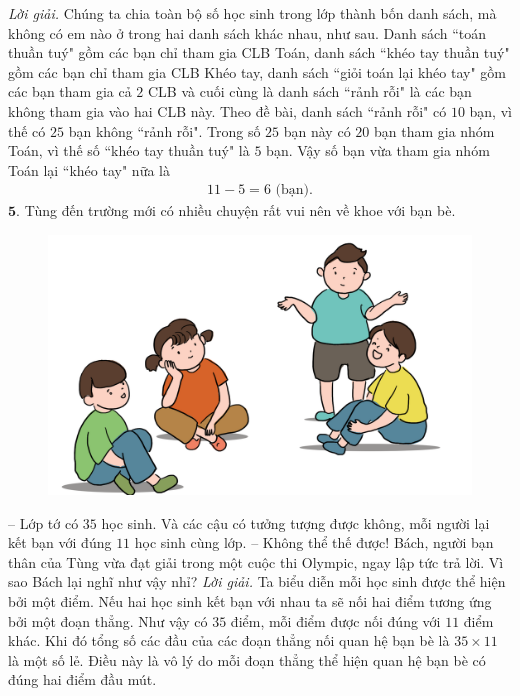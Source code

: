 \begin{multicols}{2}
\begin{figure}[H]
		\vspace*{-15pt}
	\end{figure}
	\textit{Lời giải.} 	Chúng ta chia toàn bộ số học sinh trong lớp thành bốn danh sách, mà không có em nào ở trong hai danh sách khác nhau, như sau. Danh sách ``toán thuần tuý" gồm các bạn chỉ tham gia CLB Toán, danh sách ``khéo tay thuần tuý" gồm các bạn chỉ tham gia CLB Khéo tay, danh sách ``giỏi toán lại khéo tay" gồm các bạn tham gia cả $2$ CLB  và cuối cùng là danh sách ``rảnh rỗi" là các bạn không tham gia vào hai CLB này. Theo đề bài, danh sách ``rảnh rỗi" có $10$ bạn, vì thế có $25$ bạn không ``rảnh rỗi". Trong số $25$ bạn này có $20$ bạn tham gia nhóm Toán, vì thế số ``khéo tay thuần tuý" là $5$ bạn. Vậy số bạn vừa tham gia nhóm Toán lại ``khéo tay" nữa là 
	\begin{align*}
		11-5 = 6 \text{ (bạn).}
	\end{align*}
	$\pmb{5.}$ Tùng đến trường mới có nhiều chuyện rất vui nên về khoe với bạn bè.
	\begin{figure}[H]
		\centering
		\captionsetup{labelformat= empty, justification=centering}
		\includegraphics[width=1\linewidth]{Pi10_ToanBi_Bai5}
		\vspace*{-15pt}
	\end{figure}
	-- Lớp tớ có $35$ học sinh. Và các cậu có tưởng tượng được không, mỗi người lại kết bạn với đúng $11$ học sinh cùng lớp.
	\vskip 0.1cm
	-- Không thể thế được! Bách, người bạn thân của Tùng vừa đạt giải trong một cuộc thi Olympic, ngay lập tức trả lời.
	\vskip 0.1cm
	Vì sao Bách lại nghĩ như vậy nhỉ?
	\vskip 0.1cm
	\textit{Lời giải.} 	Ta biểu diễn mỗi học sinh được thể hiện bởi một điểm. Nếu hai học sinh kết bạn với nhau ta sẽ nối hai điểm tương ứng bởi một đoạn thẳng. Như vậy có $35$ điểm, mỗi điểm được nối đúng với $11$ điểm khác. Khi đó tổng số các đầu của các đoạn thẳng nối quan hệ bạn bè là $35\times11$ là một số lẻ. Điều này là vô lý do mỗi đoạn thẳng thể hiện quan hệ bạn bè có đúng hai điểm đầu mút. 

\end{multicols}
